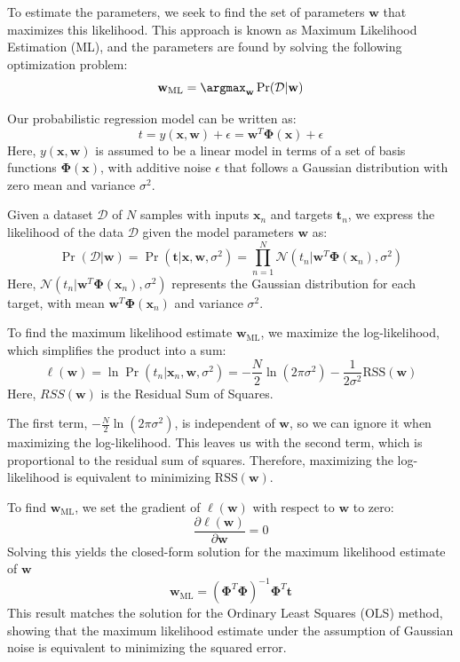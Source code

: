 To estimate the parameters, we seek to find the set of parameters $\mathbf{w}$ that maximizes this likelihood.
This approach is known as Maximum Likelihood Estimation (ML), and the parameters are found by solving the following optimization problem:
\[\mathbf{w}_{\text{ML}}=\argmax_{\mathbf{w}}\Pr(\mathcal{D}|\mathbf{w})\]

Our probabilistic regression model can be written as:
\[t=y(\mathbf{x},\mathbf{w})+\epsilon=\mathbf{w}^T\boldsymbol{\Phi}(\mathbf{x})+\epsilon\]
Here, $y(\mathbf{x},\mathbf{w})$ is assumed to be a linear model in terms of a set of basis functions $\boldsymbol{\Phi}(\mathbf{x})$, with additive noise $\epsilon$ that follows a Gaussian distribution with zero mean and variance $\sigma^2$. 

Given a dataset $\mathcal{D}$ of $N$ samples with inputs $\mathbf{x}_n$ and targets $\mathbf{t}_n$, we express the likelihood of the data $\mathcal{D}$ given the model parameters $\mathbf{w}$ as: 
\[\Pr(\mathcal{D}|\mathbf{w})=\Pr(\mathbf{t}|\mathbf{x},\mathbf{w},\sigma^2)=\prod_{n=1}^{N}\mathcal{N}(t_n|\mathbf{w}^T\boldsymbol{\Phi}(\mathbf{x}_n),\sigma^2)\]
Here, $\mathcal{N}(t_n|\mathbf{w}^T\boldsymbol{\Phi}(\mathbf{x}_n),\sigma^2)$ represents the Gaussian distribution for each target, with mean $\mathbf{w}^T\boldsymbol{\Phi}(\mathbf{x}_n)$ and variance $\sigma^2$. 

To find the maximum likelihood estimate $\mathbf{w}_{\text{ML}}$, we maximize the log-likelihood, which simplifies the product into a sum:
\[\ell (\mathbf{w})=\ln\Pr(t_n|\mathbf{x}_n, \mathbf{w} ,\sigma^2)=-\dfrac{N}{2}\ln(2\pi\sigma^2)-\dfrac{1}{2\sigma^2}\text{RSS}(\mathbf{w})\]
Here, $RSS(\mathbf{w})$ is the Residual Sum of Squares.

The first term, $-\frac{N}{2}\ln(2\pi\sigma^2)$, is independent of $\mathbf{w}$, so we can ignore it when maximizing the log-likelihood.
This leaves us with the second term, which is proportional to the residual sum of squares. 
Therefore, maximizing the log-likelihood is equivalent to minimizing $\text{RSS}(\mathbf{w})$. 

To find $\mathbf{w}_{\text{ML}}$, we set the gradient of $\ell (\mathbf{w})$ with respect to $\mathbf{w}$ to zero: 
\[\dfrac{\partial \ell (\mathbf{w})}{\partial\mathbf{w}}=0\]
Solving this yields the closed-form solution for the maximum likelihood estimate of $\mathbf{w}$
\[\mathbf{w}_{\text{ML}}={\left( \boldsymbol{\Phi}^T\boldsymbol{\Phi} \right)}^{-1}\boldsymbol{\Phi}^T\mathbf{t}\]
This result matches the solution for the Ordinary Least Squares (OLS) method, showing that the maximum likelihood estimate under the assumption of Gaussian noise is equivalent to minimizing the squared error.



















